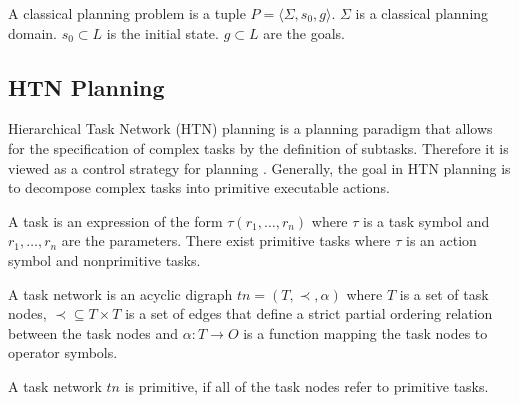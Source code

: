 \begin{definition}
  A classical planning problem is a tuple $P=\langle \Sigma, s_0, g \rangle$.
  $\Sigma$ is a classical planning domain.
  $s_0 \subset L$ is the initial state.
  $g \subset L$ are the goals.
\end{definition}

\subsection{HTN Planning}\label{sec:htn-planning}

Hierarchical Task Network (HTN) planning is a planning paradigm that allows for the specification of complex tasks by the definition of subtasks.
Therefore it is viewed as a control strategy for planning \citep[chap.~11]{ghallabAutomatedPlanningTheory2004}.
Generally, the goal in HTN planning is to decompose complex tasks into primitive executable actions.



A task is an expression of the form $\tau(r_1,\dots,r_n)$ where $\tau$ is a task symbol and $r_1,\dots,r_n$ are the parameters.
There exist primitive tasks where $\tau$ is an action symbol and nonprimitive tasks.

\begin{definition}
  A task network is an acyclic digraph $tn = (T,\prec,\alpha)$ where $T$ is a set of task nodes, $\prec \subseteq T \times T$ is a set of edges that define a strict partial ordering relation between the task nodes and $\alpha: T \rightarrow O$ is a function mapping the task nodes to operator symbols.
\end{definition}

A task network $tn$ is primitive, if all of the task nodes refer to primitive tasks. 

